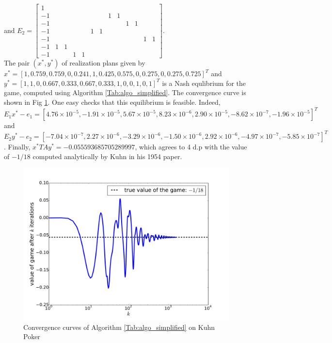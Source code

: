 \documentclass{article} %
\begin{document}
and $E_2 = \left[\begin{array}{ccccccccccccc}
1 &   &   &   &   &   &   &   &   &   &   &   &  \\
-1 &   &   &   &   &   &   & 1 & 1 &   &   &   &  \\
-1 &   &   &   &   &   &   &   &   & 1 & 1 &   &  \\
-1 &   &   &   &   & 1 & 1 &   &   &   &   &   &  \\
-1 &   &   &   &   &   &   &   &   &   &   & 1 & 1\\
-1 & 1 & 1 &   &   &   &   &   &   &   &   &   &  \\
-1 &   &   & 1 & 1 &   &   &   &   &   &   &   &  
\end{array}\right]$.\\
The pair $(x^*, y^*)$ of realization plans given by\\
$x^* = [1, 0.759, 0.759, 0, 0.241, 1, 0.425, 0.575, 0, 0.275, 0, 0.275, 0.725]^T$ and
$y^* = [1, 1, 0, 0.667, 0.333, 0.667, 0.333, 1, 0, 0, 1, 0, 1]^T$ is a Nash equlibrium for the game, computed using Algorithm  \ref{Tab:algo_simplified}. The convergence curve is shown in Fig \ref{Tab:conv_curves}. One easy checks that this equilibrium is feasible. Indeed,  $E_1x^* - e_1 = [4.76 \times 10^{-5}, -1.91 \times 10^{-5}, 5.67 \times 10^{-5}, 8.23 \times 10^{-6}, 2.90 \times 10^{-5}, -8.62 \times 10^{-7}, -1.96 \times 10^{-5}]^T$ and $E_2y^* - e_2 = [-7.04 \times 10^{-7}, 2.27 \times 10^{-6}, -3.29 \times 10^{-6}, -1.50 \times 10^{-6}, 2.92 \times 10^{-6}, -4.97 \times 10^{-7}, -5.85 \times 10^{-7}]^T$. Finally, $x^*TAy^* = -0.055593685705289997$, which agrees to 4 d.p with the value of $-1 / 18$ computed analytically by Kuhn in his 1954 paper.

\begin{figure}
  \includegraphics[width=1\linewidth]{Kuhn3112_NE.pdf}
  \caption{Convergence curves of Algorithm \ref{Tab:algo_simplified} on Kuhn Poker}
  \label{Tab:conv_curves}
\end{figure}
\end{document}
